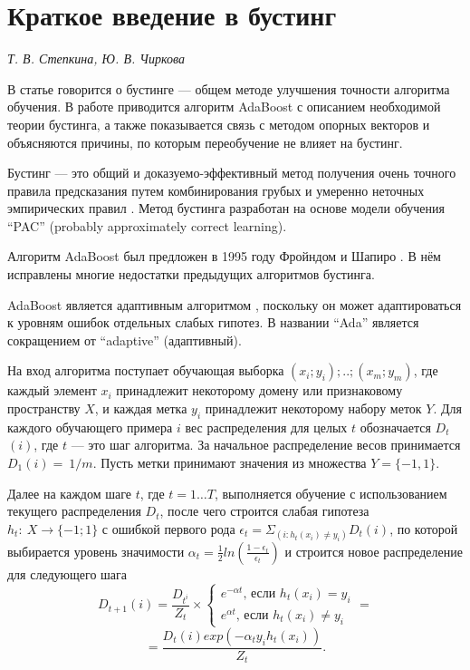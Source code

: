 \section{Краткое введение в бустинг}

\begin{flushright}
\textit{Т. В. Степкина, Ю. В. Чиркова}
\end{flushright} 

В статье \cite{Freund 1999} говорится о бустинге --- общем методе улучшения точности алгоритма обучения. В работе приводится алгоритм AdaBoost с описанием необходимой теории бустинга, а также показывается связь с методом опорных векторов и объясняются причины, по которым переобучение не влияет на бустинг.  

Бустинг --- это общий и доказуемо-эффективный метод получения очень точного правила предсказания путем комбинирования грубых и умеренно неточных эмпирических правил \cite{Freund 1999}. Метод бустинга разработан на основе модели обучения ``PAC'' (probably approximately correct learning).

Алгоритм AdaBoost был предложен в 1995 году Фройндом и Шапиро \cite{Freund 1996}. В нём исправлены многие недостатки предыдущих алгоритмов бустинга.

AdaBoost является адаптивным алгоритмом \cite{Freund 1999}, поскольку он может адаптироваться к уровням ошибок отдельных слабых гипотез. В названии ``Ada'' является сокращением от ``adaptive'' (адаптивный).

На вход алгоритма поступает обучающая выборка $(x_i;y_i);..;(x_m;y_m)$, где каждый элемент $x_i$ принадлежит некоторому домену или признаковому пространству $X$, и каждая метка $y_i$ принадлежит некоторому набору меток $Y$. Для каждого обучающего примера $i$ вес распределения для целых $t$ обозначается $D_t$ $(i)$, где $t$ --- это шаг алгоритма. За начальное распределение весов принимается $D_1(i)=~ 1/m$. Пусть метки принимают значения из множества  $Y=\{-1,1\}$. 

Далее на каждом шаге $t$, где $t = 1 \ldots T$, выполняется обучение с использованием текущего распределения $D_t$, после чего строится слабая гипотеза $h_t:~ X \to \{-1; 1\}$ с ошибкой первого рода $\epsilon_t=\Sigma_{\displaystyle (i:h_t (x_i)\ne y_i)}D_t(i)$, по которой выбирается уровень значимости $\alpha_t=\frac{\displaystyle 1}{\displaystyle 2}ln(\frac{\displaystyle 1-\epsilon_t}{\displaystyle \epsilon_t})$ и строится новое распределение для следующего шага
$$
D_{t+1}(i)=\frac{D_{t^i}}{Z_t} \times 
\begin{cases}
e^{-\alpha t}\text{, если }h_t (x_i) = y_i \\
e^{\alpha t}\text{, если }h_t (x_i)\ne y_i
\end{cases}
=
$$
$$
= \frac{D_t (i)exp(-\alpha_t y_i h_t (x_i))}{Z_t}. 
$$

